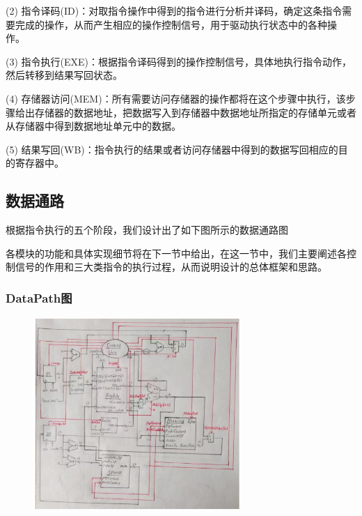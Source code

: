 \documentclass{article}
\begin{document}
(2) 指令译码(ID)：对取指令操作中得到的指令进行分析并译码，确定这条指令需要完成的操作，从而产生相应的操作控制信号，用于驱动执行状态中的各种操作。 

(3) 指令执行(EXE)：根据指令译码得到的操作控制信号，具体地执行指令动作，然后转移到结果写回状态。

(4) 存储器访问(MEM)：所有需要访问存储器的操作都将在这个步骤中执行，该步骤给出存储器的数据地址，把数据写入到存储器中数据地址所指定的存储单元或者从存储器中得到数据地址单元中的数据。 

(5) 结果写回(WB)：指令执行的结果或者访问存储器中得到的数据写回相应的目的寄存器中。

\subsection{数据通路}
根据指令执行的五个阶段，我们设计出了如下图所示的数据通路图

各模块的功能和具体实现细节将在下一节中给出，在这一节中，我们主要阐述各控制信号的作用和三大类指令的执行过程，从而说明设计的总体框架和思路。
\subsubsection{DataPath图}
\begin{figure}[H]
    \centering
    \includegraphics[width=0.7\textwidth]{pic/8.png}
    \end{figure}
\end{document}
